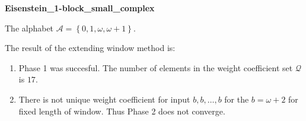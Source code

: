 \begin{exmp}
\textbf{ Eisenstein\_1-block\_small\_complex }

\label{ex:Eisenstein1-blocksmallcomplex}

The alphabet $\mathcal{A} =\left\{0, 1, \omega, \omega + 1\right\}$.

The result of the extending window method is:
\begin{enumerate}
    \item Phase 1 was succesful.
The number of elements in the weight coefficient set $\mathcal{Q}$ is $17$.

    \item There is not unique weight coefficient for input $b,b,\dots,b$ for the $b= \omega + 2 $ for fixed length of window. Thus Phase 2 does not converge.

\end{enumerate}
\end{exmp}
